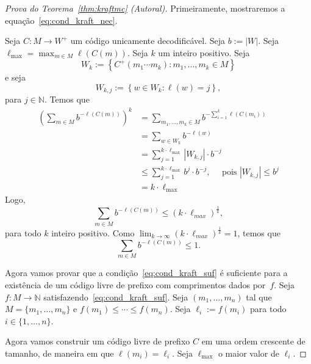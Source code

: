 \begin{proof}[Prova do Teorema~\ref{thm:kraftmc} (Autoral)]
    Primeiramente, mostraremos a equação~\eqref{eq:cond_kraft_nec}.
    
    Seja $C:M\to W^+$ um código unicamente decodificável. Seja $b :=
    |W|$. Seja $\ell_{\max} = \max_{m\in M} \ell(C(m))$. Seja $k$ um inteiro
    positivo. Seja
    \begin{equation*}
      W_k := \left\{ C^+(m_1\dotsm m_k):
      m_1,..., m_k \in M\right\}
    \end{equation*}
    e seja
    \begin{equation*}
      W_{k,j} := \left\{
      w \in W_k: \ell(w) = j
      \right\},
    \end{equation*}
    para $j\in \mathbb{N}$. Temos que
    \begin{align*}
      \left(\sum_{m\in M} b^{-\ell(C(m))}\right)^k
      &= \sum_{m_1,..., m_k \in M} b^{-\sum_{i=1}^{k} \ell(C(m_i))} \\
      &= \sum_{w\in W_k} b^{-\ell(w)}\\
      &= \sum_{j=1}^{k \cdot \ell_{\max}} |W_{k,j}| \cdot b^{-j}\\
      &\leq \sum_{j=1}^{k \cdot \ell_{\max}} b^j \cdot b^{-j},
      \quad\text{ pois }|W_{k,j}|\leq b^j\\
      & = k \cdot \ell_{\max}
    \end{align*}
Logo,
\begin{equation*}
\sum_{m\in M} b^{-\ell(C(m))} \leq (k \cdot \ell_{max})^ \frac{1}{k},
\end{equation*}
para todo $k$ inteiro positivo. Como $\lim_{k\to\infty} (k \cdot \ell_{max})^ \frac{1}{k} = 1$, temos que
\begin{equation*}
\sum_{m\in M} b^{-\ell(C(m))} \leq 1.
\end{equation*}

Agora vamos provar que a condição~\eqref{eq:cond_kraft_suf} é
suficiente para a existência de um código livre de prefixo com
comprimentos dados por~$f$. Seja $f: M\to\mathbb{N}$
satisfazendo~\eqref{eq:cond_kraft_suf}. Seja $(m_1,\dotsc, m_n)$ tal
que $M = \{m_1,\dotsc, m_n\}$ e $f(m_1) \leq \dotsm \leq f(m_n)$. Seja
$\ell_i := f(m_i)$ para todo $i\in\{1,\dotsc,n\}$.

Agora vamos construir um código livre de prefixo $C$ em uma ordem
crescente de tamanho, de maneira em que $\ell(m_i) = \ell_i$. Seja $\ell_{\max}$
o maior valor de $\ell_i$.


\end{proof}
